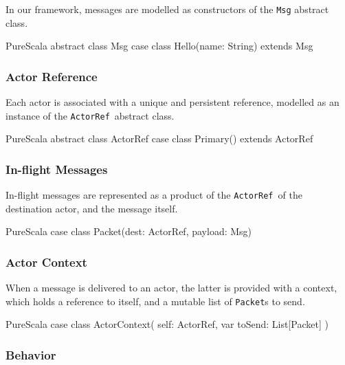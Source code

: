 \documentclass[a4paper,twoside]{article}
\newcommand{\InlineS}[1]{\lstinline[language=PureScala,basicstyle=\small\ttfamily,columns=fixed]|#1|}
\newcommand{\ActorRef}{\InlineS{ActorRef}\ }
\begin{document}
In our framework, messages are modelled as constructors of the \InlineS{Msg} abstract class.

\begin{ShortCode}{PureScala}
abstract class Msg
case class Hello(name: String) extends Msg
\end{ShortCode}

\vspace{-15pt}
\subsubsection*{Actor Reference}

Each actor is associated with a unique and persistent reference, modelled as an instance of the \ActorRef abstract class.

\begin{ShortCode}{PureScala}
abstract class ActorRef
case class Primary() extends ActorRef
\end{ShortCode}

\vspace{-15pt}
\subsubsection*{In-flight Messages}

In-flight messages are represented as a product of the \ActorRef of the destination actor, and the message itself.

\begin{ShortCode}{PureScala}
case class Packet(dest: ActorRef, payload: Msg)
\end{ShortCode}

\vspace{-15pt}
\subsubsection*{Actor Context}

When a message is delivered to an actor, the latter is provided with a context,
which holds a reference to itself, and a mutable list of \InlineS{Packet}s to send.

\begin{ShortCode}{PureScala}
case class ActorContext(
  self: ActorRef,
  var toSend: List[Packet]
)
\end{ShortCode}

\vspace{-15pt}
\subsubsection*{Behavior}
\end{document}

